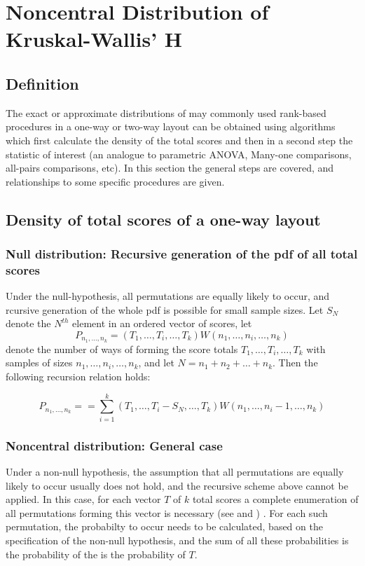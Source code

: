 \newpage
\section{Noncentral Distribution of Kruskal-Wallis' H}

\subsection{Definition}
The exact or approximate distributions of may commonly used rank-based procedures in a one-way or two-way layout can be obtained using algorithms which first calculate the density of the total scores and then in a second step the statistic of interest (an analogue to parametric ANOVA, Many-one comparisons, all-pairs comparisons, etc). In this section the general steps are covered, and relationships to some specific procedures are given.

\subsection{Density of total scores of a one-way layout}
\subsubsection{Null distribution: Recursive generation of the pdf of all total scores}
Under the null-hypothesis, all permutations are equally likely to occur, and rcursive generation of the whole pdf is possible for small sample sizes. 
Let $S_N$ denote the $N^{th}$ element in an ordered vector of scores, let 
\begin{equation} 
	P_{n_1,\ldots,n_k} = (T_1,\ldots,T_i,\ldots,T_k) W(n_1,\ldots,n_i,\ldots,n_k) 
\end{equation}
denote the number of ways of forming the score totals $T_1,\ldots,T_i,\ldots,T_k$ with samples of sizes $n_1,\ldots,n_i,\ldots,n_k$, and let $N = n_1 + n_2 + \ldots + n_k$. Then the following recursion relation holds:

\begin{equation} 
	P_{n_1,\ldots,n_k} =  = \sum_{i=1}^k (T_1,\ldots,T_i-S_N,\ldots,T_k) W(n_1,\ldots,n_i-1,\ldots,n_k)
\end{equation}

\subsubsection{Noncentral distribution: General case}
Under a non-null hypothesis, the assumption that all permutations are equally likely to occur usually does not hold, and the recursive scheme above cannot be applied. In this case, for each vector $T$ of $k$ total scores a complete enumeration of all permutations forming this vector is necessary (see \cite{Chase_1970} and \cite{Stockmal_1962}) . For each such permutation, the probabilty to occur needs to be calculated, based on the specification of the non-null hypothesis, and the sum of all these  probabilities is the probability of the is the probability of $T$.

